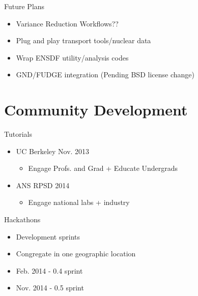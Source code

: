 \documentclass[xcolor=x11names,compress]{beamer}
\renewcommand{\(}{\begin{columns}}
\renewcommand{\)}{\end{columns}}
\newcommand{\<}[1]{\begin{column}{#1}}
\renewcommand{\>}{\end{column}}
\begin{document}
\begin{frame}{Future Plans}
    \begin{itemize}
    \item Variance Reduction Workflows??
    \item Plug and play transport tools/nuclear data
    \item Wrap ENSDF utility/analysis codes
    \item GND/FUDGE integration (Pending BSD license change) 
    \end{itemize}
\end{frame}


\section{Community Development}

\begin{frame}{Tutorials}
    \begin{itemize}
        \item UC Berkeley Nov. 2013
        \begin{itemize}
            \item Engage Profs. and Grad + Educate Undergrads
        \end{itemize}
        \item ANS RPSD 2014
        \begin{itemize}
            \item Engage national labs + industry
        \end{itemize}
    \end{itemize}
\end{frame}

\begin{frame}{Hackathons}
    \begin{itemize}
        \item Development sprints
        \item Congregate in one geographic location
        \item Feb. 2014 - 0.4 sprint 
        \item Nov. 2014 - 0.5 sprint
    \end{itemize}
\end{frame}

\end{document}
